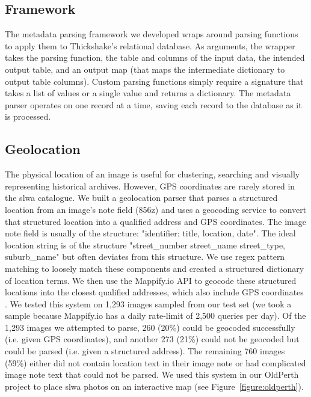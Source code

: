 \documentclass[10pt, a4paper]{article}
\begin{document}
\subsection{Framework}
\label{subsection:metadata_parsing:framework}
The metadata parsing framework we developed wraps around parsing functions to apply them to Thickshake's relational database. As arguments, the wrapper takes the parsing function, the table and columns of the input data, the intended output table, and an output map (that maps the intermediate dictionary to output table columns). Custom parsing functions simply require a signature that takes a list of values or a single value and returns a dictionary. The metadata parser operates on one record at a time, saving each record to the database as it is processed.

\subsection{Geolocation}
\label{subsection:metadata_parsing:geolocation}
The physical location of an image is useful for clustering, searching and visually representing historical archives. However, GPS coordinates are rarely stored in the \Gls{slwa} catalogue. We built a geolocation parser that parses a structured location from an image's note field (856z) and uses a geocoding service to convert that structured location into a qualified address and GPS coordinates. The image note field is usually of the structure: "identifier: title, location, date". The ideal location string is of the structure "street\_number street\_name street\_type, suburb\_name" but often deviates from this structure. We use regex pattern matching to loosely match these components and created a structured dictionary of location terms. We then use the Mappify.io API to geocode these structured locations into the closest qualified addresses, which also include GPS coordinates \cite{mappify}. We tested this system on 1,293 images sampled from our test set (we took a sample because Mappify.io has a daily rate-limit of 2,500 queries per day). Of the 1,293 images we attempted to parse, 260 (20\%) could be geocoded successfully (i.e. given GPS coordinates), and another 273 (21\%) could not be geocoded but could be parsed (i.e. given a structured address). The remaining 760 images (59\%) either did not contain location text in their image note or had complicated image note text that could not be parsed. We used this system in our OldPerth project to place \Gls{slwa} photos on an interactive map (see Figure~\ref{figure:oldperth}).
\end{document}
